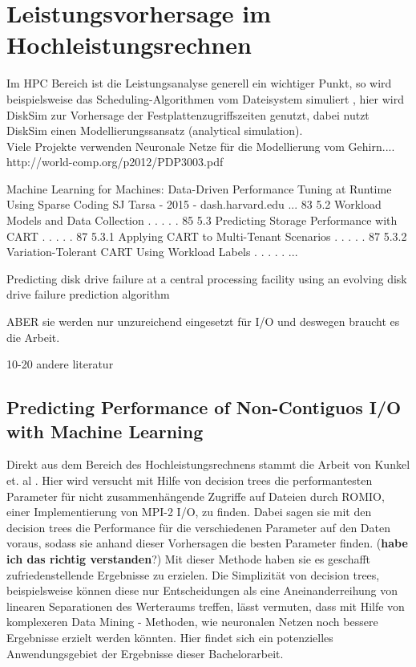 \documentclass[
	12pt,
	a4paper,
	BCOR10mm,
	DIV14,
	listof=totoc,
	bibliography=totoc,
	headsepline
]{scrreprt}
\begin{document}
\section{Leistungsvorhersage im Hochleistungsrechnen}

	Im HPC Bereich ist die Leistungsanalyse generell ein wichtiger Punkt, so wird beispielsweise das Scheduling-Algorithmen vom Dateisystem simuliert \cite{Liu_towardssimulation}, hier wird DiskSim \cite{Bucy08thedisksim} zur Vorhersage der Festplattenzugriffszeiten genutzt, dabei nutzt DiskSim einen Modellierungssansatz (analytical simulation). \\

Viele Projekte verwenden Neuronale Netze für die Modellierung vom Gehirn....
http://world-comp.org/p2012/PDP3003.pdf

Machine Learning for Machines: Data-Driven Performance Tuning at Runtime Using Sparse Coding
SJ Tarsa - 2015 - dash.harvard.edu
... 83 5.2 Workload Models and Data Collection . . . . . 85 5.3 Predicting Storage
Performance with CART . . . . . 87 5.3.1 Applying CART to Multi-Tenant Scenarios . . . . .
87 5.3.2 Variation-Tolerant CART Using Workload Labels . . . . . ... 

Predicting disk drive failure at a central processing facility using an evolving disk drive failure prediction algorithm

ABER sie werden nur unzureichend eingesetzt für I/O und deswegen braucht es die Arbeit.

10-20 andere literatur

\subsection{Predicting Performance of Non-Contiguos I/O with Machine Learning}
Direkt aus dem Bereich des Hochleistungsrechnens stammt die Arbeit von Kunkel et. al \cite{UMLTPTPONI15}. Hier wird versucht mit Hilfe von decision trees die performantesten Parameter für nicht zusammenhängende Zugriffe auf Dateien durch ROMIO, einer Implementierung von MPI-2 I/O, zu finden. Dabei sagen sie mit den decision trees die Performance für die verschiedenen Parameter auf den Daten voraus, sodass sie anhand dieser Vorhersagen die besten Parameter finden. (\textbf{habe ich das richtig verstanden}?) Mit dieser Methode haben sie es geschafft zufriedenstellende Ergebnisse zu erzielen. Die Simplizität von decision trees, beispielsweise können diese nur Entscheidungen als eine Aneinanderreihung von linearen Separationen des Werteraums treffen, lässt vermuten, dass mit Hilfe von komplexeren Data Mining - Methoden, wie neuronalen Netzen noch bessere Ergebnisse erzielt werden könnten. Hier findet sich ein potenzielles Anwendungsgebiet der Ergebnisse dieser Bachelorarbeit.
\end{document}
